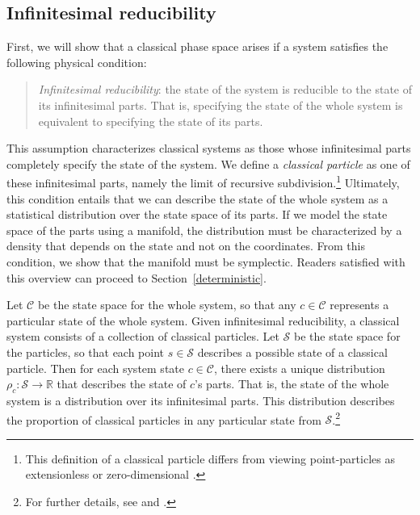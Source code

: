 \documentclass[12pt, twoside]{article}
\newcommand\bs{\begin{singlespace}}
\newcommand\es{\end{singlespace}}
\begin{document}

\subsection{Infinitesimal reducibility}
\label{infinitesimal}

First, we will show that a classical phase space arises if a system satisfies the following physical condition:

\begin{quotation}
\bs \noindent
\textit{Infinitesimal reducibility}: the state of the system is reducible to the state of its infinitesimal parts. That is, specifying the state of the whole system is equivalent to specifying the state of its parts.
\es
\end{quotation}


\noindent
This assumption characterizes classical systems as those whose infinitesimal parts completely specify the state of the system. We define a \textit{classical particle} as one of these infinitesimal parts, namely the limit of recursive subdivision.\footnote{This definition of a classical particle differs from viewing point-particles as extensionless \parencites[]{Butterfieldpoints} or zero-dimensional \parencites[]{Wilson}.} Ultimately, this condition entails that we can describe the state of the whole system as a statistical distribution over the state space of its parts. If we model the state space of the parts using a manifold, the distribution must be characterized by a density that depends on the state and not on the coordinates. From this condition, we show that the manifold must be symplectic. Readers satisfied with this overview can proceed to Section~\ref{deterministic}.

Let $\mathcal{C}$ be the state space for the whole system, so that any $c \in \mathcal{C}$ represents a particular state of the whole system. Given infinitesimal reducibility, a classical system consists of a collection of classical particles. Let $\mathcal{S}$ be the state space for the particles, so that each point $s \in \mathcal{S}$ describes a possible state of a classical particle. Then for each system state $c \in \mathcal{C}$, there exists a unique distribution $\rho_c : \mathcal{S} \to \mathbb{R} $ that describes the state of $c$'s parts. That is, the state of the whole system is a distribution over its infinitesimal parts. This distribution describes the proportion of classical particles in any particular state from $\mathcal{S}$.\footnote{For further details, see \textcites[]{AoPPhy1} and \textcites{shpmp}.}
\end{document}
